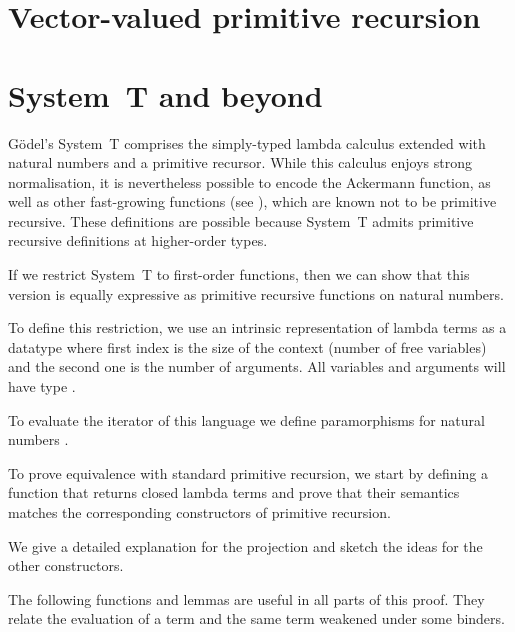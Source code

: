 \documentclass{jfp}
\begin{document}
\section{Vector-valued primitive recursion}
\label{sec:vect-valu-prim}

\section{System~T and beyond}
\label{sec:system-t-beyond}

Gödel's System~T comprises the simply-typed lambda calculus extended
with natural numbers and a primitive recursor. While this calculus
enjoys strong normalisation, it is nevertheless possible to encode the
Ackermann function, as well as other fast-growing functions (see
\cite{Harpersbook,DBLP:journals/corr/Widemann16}), which are known not 
to be primitive recursive. These definitions are possible because
System~T admits primitive recursive definitions at higher-order types.

If we restrict System~T to first-order functions, then we can show
that this version is equally expressive as primitive recursive
functions on natural numbers. 

To define this restriction, we use an intrinsic representation of
lambda terms as a datatype  where first index is the size
of the context (number of free variables) and the second one is the
number of arguments. All variables and arguments will have type \ANat.


To evaluate the iterator of this language we define paramorphisms for
natural numbers \cite{Meijer-bananas}. 


\para
\evalST


To prove equivalence with standard primitive recursion, we start by defining a
function that returns closed lambda terms and prove that their
semantics matches the corresponding constructors of primitive recursion.


\prToStSig
\embedPRSTSoundSig


We give a detailed explanation for the projection and sketch the ideas for the other constructors.

The following functions and lemmas are useful in all parts of this
proof. They relate the evaluation of a term and the same term weakened
under some binders.

\prepLambdas
\end{document}
